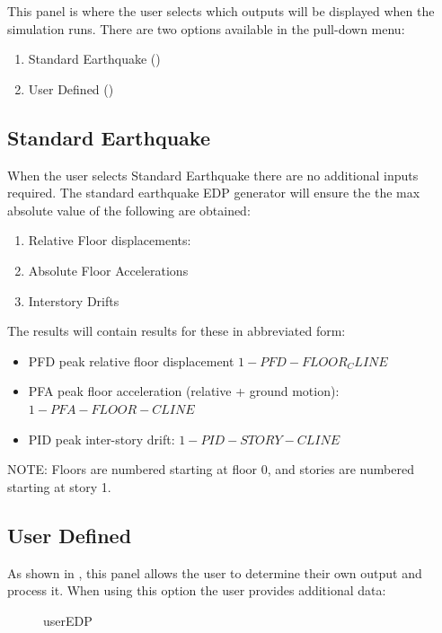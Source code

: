 This panel is where the user selects which outputs will be displayed when
the simulation runs. There are two options available in the pull-down
menu:
\begin{enumerate}
\item Standard Earthquake ()
\item User Defined ()
\end{enumerate}

\subsection{Standard Earthquake}\label{subsec:sectionStandardEarthquake}
When the user selects Standard Earthquake there are no additional
inputs required. The standard earthquake EDP generator will ensure the
the max absolute value of the following are obtained:
\begin{enumerate}
\item Relative Floor displacements:
\item Absolute Floor Accelerations
\item Interstory Drifts
\end{enumerate}

The results will contain results for these in abbreviated form:
\begin{itemize}
\item PFD peak relative floor displacement $1-PFD-FLOOR_CLINE$
\item PFA peak floor acceleration (relative + ground motion):
  $1-PFA-FLOOR-CLINE$
\item PID peak inter-story drift: $1-PID-STORY-CLINE$
\end{itemize}

NOTE: Floors are numbered starting at floor 0, and stories are numbered starting at story 1.

\subsection{User Defined}\label{subsec:sectionUserDefined}
As shown in , this panel allows the user to determine their own output and process it. When using this option the user provides additional data:

\begin{figure}[!htbp]
  \caption{userEDP}
  \label{fig:userEDP}
\end{figure}

